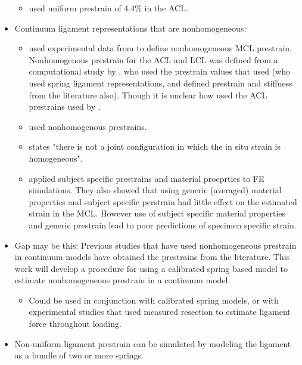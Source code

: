 \documentclass{article}
\begin{document}
\begin{itemize}
\begin{itemize}
        \item \cite{limbert_three-dimensional_2004} used uniform prestrain of 4.4\% in the ACL.
    \end{itemize}
    \item Continuum ligament representations that are nonhomogeneous:
    \begin{itemize}
        \item \cite{dhaher_effect_2010} used experimental data from \cite{gardiner_strain_2001} to define nonhomogeneous MCL prestrain. Nonhomogenous prestrain for the ACL and LCL was defined from a computational study by \cite{pena_three-dimensional_2006}, who used the prestrain values that \cite{blankevoort_ligament-bone_1991} used (who used spring ligament representations, and defined prestrain and stiffness from the literature also). Though it is unclear how \cite{dhaher_effect_2010} used the ACL prestrains used by \cite{pena_three-dimensional_2006}.
        \item \cite{pena_three-dimensional_2006} used nonhomogenous prestrains.
        \item \cite{weiss_three-dimensional_2005} states "there is not a joint configuration in which the in situ strain is homogeneous".
        \item \cite{gardiner_subject-specific_2003} applied subject specific prestrains and material proeprties to FE simulations. They also showed that using generic (averaged) material properties and subject specific perstrain had little effect on the estimated strain in the MCL. However use of subject specific material properties and generic prestrain lead to poor predictions of specimen specific strain.
    \end{itemize}
    \item Gap may be this: Previous studies that have used nonhomogeneous prestrain in continuum models have obtained the prestrains from the literature. This work will develop a procedure for using a calibrated spring based model to estimate nonhomogeneous prestrain in a continuum model.
    \begin{itemize}
        \item Could be used in conjunction with calibrated spring models, or with experimental studies that used measured resection to estimate ligament force throughout loading.
    \end{itemize}
    \item Non-uniform ligament prestrain can be simulated by modeling the ligament as a bundle of two or more springs.
    \begin{itemize}

\end{itemize}
\end{itemize}
\end{document}
